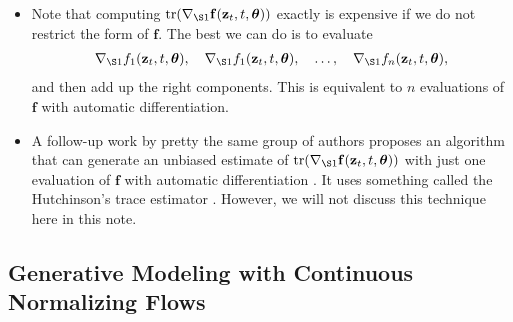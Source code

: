 \documentclass[10pt]{article}
\newcommand{\ve}[1]{\mathbf{#1}}
\newcommand{\ves}[1]{\boldsymbol{#1}}
\newcommand{\tr}{\mathrm{tr}}
\begin{document}
\begin{itemize}
  \item Note that computing $\tr(\nabla_{\S1}  \ve{f}(\ve{z}_t, t, \ves{\theta}) )$ exactly is expensive if we do not restrict the form of $\ve{f}$. The best we can do is to evaluate
  \begin{align*}
    \nabla_{\S1} f_1(\ve{z}_t, t, \ves{\theta}), 
    \quad \nabla_{\S1} f_1(\ve{z}_t, t, \ves{\theta}), 
    \quad \dotsc, 
    \quad \nabla_{\S1} f_n(\ve{z}_t, t, \ves{\theta}), 
  \end{align*}
  and then add up the right components. This is equivalent to $n$ evaluations of $\ve{f}$ with automatic differentiation.

  \item A follow-up work by pretty the same group of authors proposes an algorithm that can generate an unbiased estimate of $\tr(\nabla_{\S1}  \ve{f}(\ve{z}_t, t, \ves{\theta}) )$ with just one evaluation of $\ve{f}$ with automatic differentiation \cite{Grathwohl:2018}. It uses something called the Hutchinson's trace estimator \cite{Hutchinson:1989}. However, we will not discuss this technique here in this note.  
\end{itemize}

\subsection{Generative Modeling with Continuous Normalizing Flows}
\end{document}
